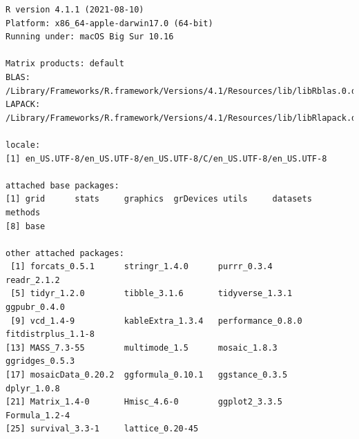 \documentclass[
  letterpaper,
  DIV=11,
  numbers=noendperiod]{scrreprt}
\begin{document}
\begin{verbatim}
R version 4.1.1 (2021-08-10)
Platform: x86_64-apple-darwin17.0 (64-bit)
Running under: macOS Big Sur 10.16

Matrix products: default
BLAS:   /Library/Frameworks/R.framework/Versions/4.1/Resources/lib/libRblas.0.dylib
LAPACK: /Library/Frameworks/R.framework/Versions/4.1/Resources/lib/libRlapack.dylib

locale:
[1] en_US.UTF-8/en_US.UTF-8/en_US.UTF-8/C/en_US.UTF-8/en_US.UTF-8

attached base packages:
[1] grid      stats     graphics  grDevices utils     datasets  methods  
[8] base     

other attached packages:
 [1] forcats_0.5.1      stringr_1.4.0      purrr_0.3.4        readr_2.1.2       
 [5] tidyr_1.2.0        tibble_3.1.6       tidyverse_1.3.1    ggpubr_0.4.0      
 [9] vcd_1.4-9          kableExtra_1.3.4   performance_0.8.0  fitdistrplus_1.1-8
[13] MASS_7.3-55        multimode_1.5      mosaic_1.8.3       ggridges_0.5.3    
[17] mosaicData_0.20.2  ggformula_0.10.1   ggstance_0.3.5     dplyr_1.0.8       
[21] Matrix_1.4-0       Hmisc_4.6-0        ggplot2_3.3.5      Formula_1.2-4     
[25] survival_3.3-1     lattice_0.20-45   


\end{verbatim}
\end{document}
